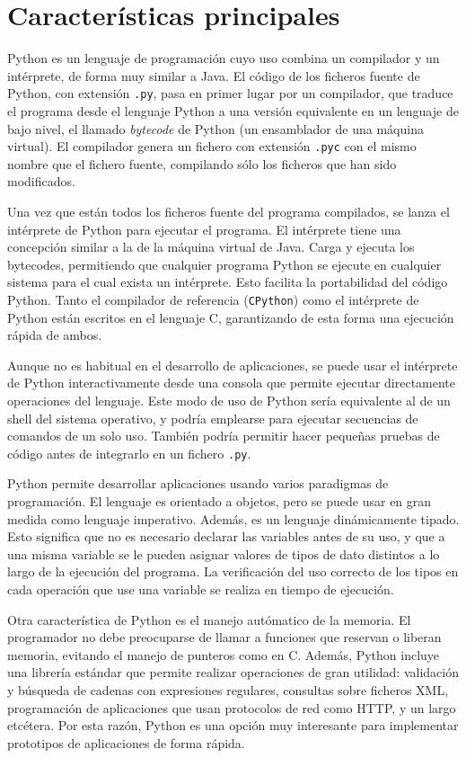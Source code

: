 \section{Características principales}

Python es un lenguaje de programación cuyo uso combina un compilador y un intérprete, de forma muy similar a Java. El código de los ficheros fuente de Python, con extensión \texttt{.py}, pasa en primer lugar por un compilador, que traduce el programa desde el lenguaje Python a una versión equivalente en un lenguaje de bajo nivel, el llamado \emph{bytecode} de Python (un ensamblador de una máquina virtual). El compilador genera un fichero con extensión \texttt{.pyc} con el mismo nombre que el fichero fuente, compilando sólo los ficheros que han sido modificados.

Una vez que están todos los ficheros fuente del programa compilados, se lanza el intérprete de Python para ejecutar el programa. El intérprete tiene una concepción similar a la de la máquina virtual de Java. Carga y ejecuta los bytecodes, permitiendo que cualquier programa Python se ejecute en cualquier sistema para el cual exista un intérprete. Esto facilita la portabilidad del código Python. Tanto el compilador de referencia (\texttt{CPython}) como el intérprete de Python están escritos en el lenguaje C, garantizando de esta forma una ejecución rápida de ambos.

Aunque no es habitual en el desarrollo de aplicaciones, se puede usar el intérprete de Python interactivamente desde una consola que permite ejecutar directamente operaciones del lenguaje. Este modo de uso de Python sería equivalente al de un shell del sistema operativo, y podría emplearse para ejecutar secuencias de comandos de un solo uso. También podría permitir hacer pequeñas pruebas de código antes de integrarlo en un fichero \texttt{.py}.

Python permite desarrollar aplicaciones usando varios paradigmas de programación. El lenguaje es orientado a objetos, pero se puede usar en gran medida como lenguaje imperativo. Además, es un lenguaje dinámicamente tipado. Esto significa que no es necesario declarar las variables antes de su uso, y que a una misma variable se le pueden asignar valores de tipos de dato distintos a lo largo de la ejecución del programa. La verificación del uso correcto de los tipos en cada operación que use una variable se realiza en tiempo de ejecución.

Otra característica de Python es el manejo autómatico de la memoria. El programador no debe preocuparse de llamar a funciones que reservan o liberan memoria, evitando el manejo de punteros como en C. Además, Python incluye una librería estándar que permite realizar operaciones de gran utilidad: validación y búsqueda de cadenas con expresiones regulares, consultas sobre ficheros XML, programación de aplicaciones que usan protocolos de red como HTTP, y un largo etcétera. Por esta razón, Python es una opción muy interesante para implementar prototipos de aplicaciones de forma rápida.


